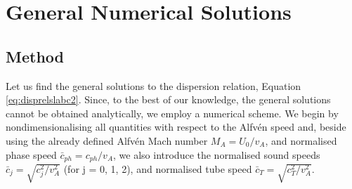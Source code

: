 



\section{General Numerical Solutions}
\label{sec:numerics}



\subsection{Method}
\label{subsec:nummethod}

Let us find the general solutions to the dispersion relation, Equation \eqref{eq:disprelslabc2}.
Since, to the best of our knowledge, the general solutions cannot be obtained analytically, we employ a numerical scheme.
We begin by nondimensionalising all quantities with respect to the Alfv\'en speed and, beside using the already defined Alfv\'en Mach number $M_A = U_0/v_A$, and normalised phase speed $\bar c_{ph} = c_{ph} / v_A$, we also introduce the normalised sound speeds $\bar c_j = \sqrt{ c_j^2 / v_A^2 }$ (for j = 0, 1, 2), and normalised tube speed $\bar c_T = \sqrt{ c_T^2 / v_A^2 }$.

